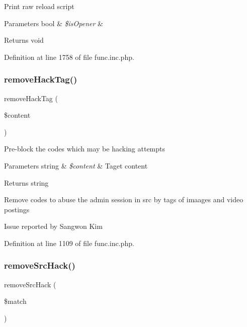 Print raw reload script


\begin{DoxyParams}[1]{Parameters}
bool & {\em \$is\+Opener} & \\
\hline
\end{DoxyParams}
\begin{DoxyReturn}{Returns}
void 
\end{DoxyReturn}


Definition at line 1758 of file func.\+inc.\+php.

\mbox{\label{func_8inc_8php_abde22c0ee89dfd569abd1e338b3b2cf5}} 
\subsubsection{\texorpdfstring{remove\+Hack\+Tag()}{removeHackTag()}}
{\footnotesize\ttfamily remove\+Hack\+Tag (\begin{DoxyParamCaption}\item[{}]{\$content }\end{DoxyParamCaption})}

Pre-\/block the codes which may be hacking attempts


\begin{DoxyParams}[1]{Parameters}
string & {\em \$content} & Taget content \\
\hline
\end{DoxyParams}
\begin{DoxyReturn}{Returns}
string 
\end{DoxyReturn}
Remove codes to abuse the admin session in src by tags of imaages and video postings
\begin{DoxyItemize}
\item Issue reported by Sangwon Kim
\end{DoxyItemize}

Definition at line 1109 of file func.\+inc.\+php.

\mbox{\label{func_8inc_8php_aac01d80c0a850100a25ae023b78e6b7c}} 
\subsubsection{\texorpdfstring{remove\+Src\+Hack()}{removeSrcHack()}}
{\footnotesize\ttfamily remove\+Src\+Hack (\begin{DoxyParamCaption}\item[{}]{\$match }\end{DoxyParamCaption})}

